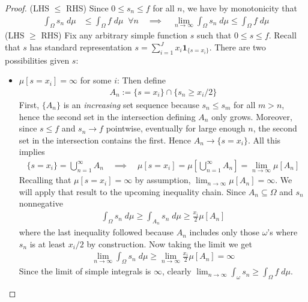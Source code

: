 \documentclass[12pt]{article}
\theoremstyle{plain}
\theoremstyle{definition}
\theoremstyle{remark}
\newcommand{\ra}{\rightarrow}
\newcommand{\one}[1]{\mathbf{1}_{#1}}
\newcommand{\ninf}{_{n=1}^\infty}
\newcommand{\limn}{\lim_{n\rightarrow\infty}}
\begin{document}
\begin{proof}
(LHS $\leq$ RHS) Since $0\leq s_n\leq f$ for all $n$, we have by
monotonicity that
\begin{align*}
  \int_\Omega s_n \;d\mu
  &\leq
  \int_\Omega f \;d\mu
  \;\; \forall n
  \quad \implies\quad
  \limn \int_\Omega s_n \;d\mu
  \leq
  \int_\Omega f \;d\mu
\end{align*}
(LHS $\geq$ RHS)
Fix any arbitrary simple function $s$ such that $0\leq s\leq f$.
Recall that $s$ has standard representation
$s = \sum_{i=1}^J x_i\one{\{s=x_i\}}$.
There are two possibilities given $s$:
\begin{itemize}
  \item $\mu[s=x_i]=\infty$ for some $i$:
    Then define
    \begin{align*}
      A_n := \{s=x_i\}\cap \{s_n\geq x_i/2\}
    \end{align*} First, $\{A_n\}$ is an \emph{increasing} set sequence
    because $s_n\leq s_m$ for all $m>n$, hence the second set in the
    intersection defining $A_n$ only grows. Moreover, since $s\leq f$
    and $s_n\ra f$ pointwise, eventually for large enough $n$, the
    second set in the intersection contains the first.
    Hence $A_n\ra\{s=x_i\}$. All this implies
    \begin{align*}
      \{s=x_i\}
      = \bigcup\ninf A_n
      \quad\implies\quad
      \mu[s=x_i]
      = \mu\left[\bigcup\ninf A_n\right]
      = \limn \mu[A_n]
    \end{align*}
    Recalling that $\mu[s=x_i]=\infty$ by assumption,
    $\limn \mu[A_n]=\infty$.  We will apply that result to the upcoming
    inequality chain.
    Since $A_n\subseteq\Omega$ and $s_n$ nonnegative
    \begin{align*}
      \int_\Omega s_n\;d\mu
      \geq \int_{A_n} s_n\;d\mu
      \geq \frac{x_i}{2}\mu[A_n]
    \end{align*}
    where the last inequality followed because $A_n$ includes only those
    $\omega$'s where $s_n$ is at least $x_i/2$ by construction.
    Now taking the limit we get
    \begin{align*}
      \limn \int_\Omega s_n\;d\mu
      \geq \limn \frac{x_i}{2}\mu[A_n] = \infty
    \end{align*}
    Since the limit of simple integrals is $\infty$, clearly
    $\limn \int_\omega s_n \geq \int_\Omega f\;d\mu$.


\end{itemize}
\end{proof}
\end{document}

